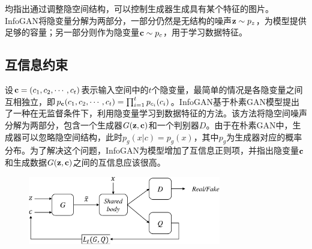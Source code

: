 \citet{mirza2014conditional,odena2017conditional,miyato2018cgans}均指出通过调整隐空间结构，可以控制生成器生成具有某个特征的图片。InfoGAN\citep{chen2016infogan}将隐变量分解为两部分，一部分仍然是无结构的噪声$\mathbf{z} \sim p_z$，为模型提供足够的容量；另一部分则作为隐变量$\mathbf{c} \sim p_c$，用于学习数据特征。

\subsection{互信息约束}
设$\mathbf{c} = (c_1, c_2, \cdots, c_t)$表示输入空间中的$t$个隐变量，最简单的情况是各隐变量之间互相独立，即$p_{\mathbf{c}}(c_1, c_2, \cdots, c_t) = \prod_{i=1}^t p_{c_i}(c_i)$。InfoGAN基于朴素GAN模型提出了一种在无监督条件下，利用隐变量学习到数据特征的方法。该方法将隐空间噪声分解为两部分，包含一个生成器$G(\mathbf{z}, \mathbf{c})$和一个判别器$D$。由于在朴素GAN中，生成器可以忽略隐空间结构，此时$p_g(x|c) = p_g(x)$，其中$p_g$为生成器对应的概率分布。为了解决这个问题，InfoGAN为模型增加了互信息正则项，并指出隐变量$\mathbf{c}$和生成数据$G(\mathbf{z}, \mathbf{c})$之间的互信息应该很高。
\begin{figure}[hbtp]
  \centering
  \includegraphics[width=0.75\textwidth]{Img/arch-infogan.pdf}
  \label{fig:arch-infogan}
\end{figure}

